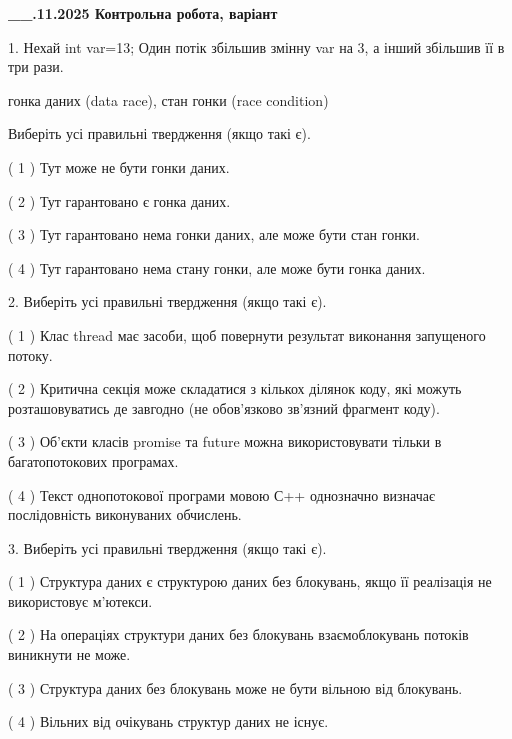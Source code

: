 \documentclass[12pt, ukrainian]{article}
\begin{document}
\newpage
\begin {large}

\textbf{\_\_.11.2025 Контрольна робота, варіант  }\par


{
1. Нехай int var=13; Один потік збільшив змінну var на 3, а інший збільшив її в три рази.

гонка даних (data race), стан гонки (race condition)

Виберіть усі правильні твердження (якщо такі є).\par
\vspace{2mm}
( 1 ) Тут може не бути гонки даних.%

( 2 ) Тут гарантовано є гонка даних.%

( 3 ) Тут гарантовано нема гонки даних, але може бути стан гонки.%

( 4 ) Тут гарантовано нема стану гонки, але може бути гонка даних.%


2. Виберіть усі правильні твердження (якщо такі є).\par
\vspace{2mm}

( 1 ) Клас thread має засоби, щоб повернути результат виконання запущеного потоку.%

( 2 ) Критична секція може складатися з кількох ділянок коду, які можуть розташовуватись де завгодно (не обов’язково зв’язний фрагмент коду).%

( 3 ) Об’єкти класів promise та future можна використовувати тільки в багатопотокових програмах.%

( 4 ) Текст однопотокової програми мовою С++ однозначно визначає послідовність виконуваних обчислень.%


3. Виберіть усі правильні твердження (якщо такі є).\par


( 1 ) Структура даних є структурою даних без блокувань, якщо її реалізація не використовує м’ютекси.%

( 2 ) На операціях структури даних без блокувань взаємоблокувань потоків виникнути не може.%

( 3 ) Структура даних без блокувань може не бути вільною від блокувань.%

( 4 ) Вільних від очікувань структур даних не існує.%


}
\end{large}
\end{document}
